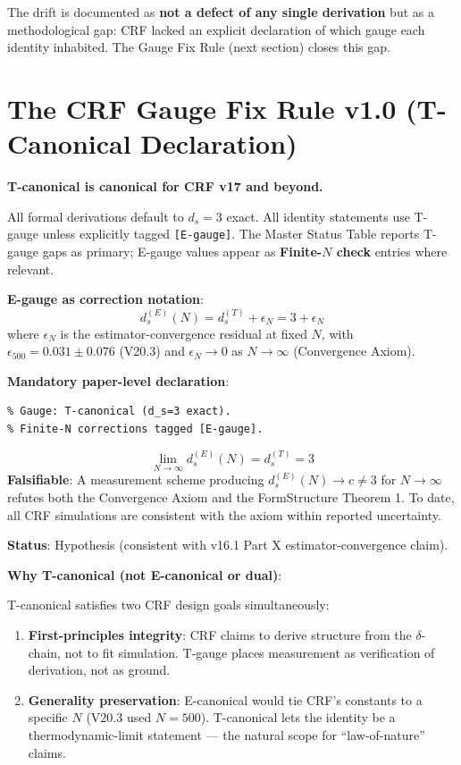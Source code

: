 \documentclass[12pt, a4paper]{article}
\begin{document}
The drift is documented as \textbf{not a defect of any single derivation} but
as a methodological gap: CRF lacked an explicit declaration of which gauge
each identity inhabited. The Gauge Fix Rule (next section) closes this gap.

\section{The CRF Gauge Fix Rule v1.0 (T-Canonical Declaration)}

\begin{formalbox}[title={Gauge Fix Rule v1.0 (Authoritative)}]
\textbf{T-canonical is canonical for CRF v17 and beyond.}

All formal derivations default to $d_s = 3$ exact. All identity statements
use T-gauge unless explicitly tagged \texttt{[E-gauge]}. The Master Status
Table reports T-gauge gaps as primary; E-gauge values appear as
\textbf{Finite-$N$ check} entries where relevant.

\textbf{E-gauge as correction notation}:
\[
  d_s^{(E)}(N) = d_s^{(T)} + \epsilon_N = 3 + \epsilon_N
\]
where $\epsilon_N$ is the estimator-convergence residual at fixed $N$, with
$\epsilon_{500} = 0.031 \pm 0.076$ (V20.3) and $\epsilon_N \to 0$ as
$N \to \infty$ (Convergence Axiom).

\textbf{Mandatory paper-level declaration}:
\begin{verbatim}
% Gauge: T-canonical (d_s=3 exact).
% Finite-N corrections tagged [E-gauge].
\end{verbatim}
\end{formalbox}

\begin{formalbox}[title={The Convergence Axiom (Hypothesis)}]
\[
  \lim_{N\to\infty} d_s^{(E)}(N) = d_s^{(T)} = 3
\]
\textbf{Falsifiable}: A measurement scheme producing $d_s^{(E)}(N) \to c \neq 3$
for $N \to \infty$ refutes both the Convergence Axiom and the FormStructure
Theorem 1. To date, all CRF simulations are consistent with the axiom within
reported uncertainty.

\textbf{Status}: Hypothesis (consistent with v16.1 Part X estimator-convergence
claim).
\end{formalbox}

\textbf{Why T-canonical (not E-canonical or dual)}:

T-canonical satisfies two CRF design goals simultaneously:
\begin{enumerate}[leftmargin=*]
  \item \textbf{First-principles integrity}: CRF claims to derive structure from
        the $\delta$-chain, not to fit simulation. T-gauge places measurement
        as verification of derivation, not as ground.
  \item \textbf{Generality preservation}: E-canonical would tie CRF's constants
        to a specific $N$ (V20.3 used $N=500$). T-canonical lets the identity
        be a thermodynamic-limit statement --- the natural scope for
        ``law-of-nature'' claims.
\end{enumerate}
\end{document}
